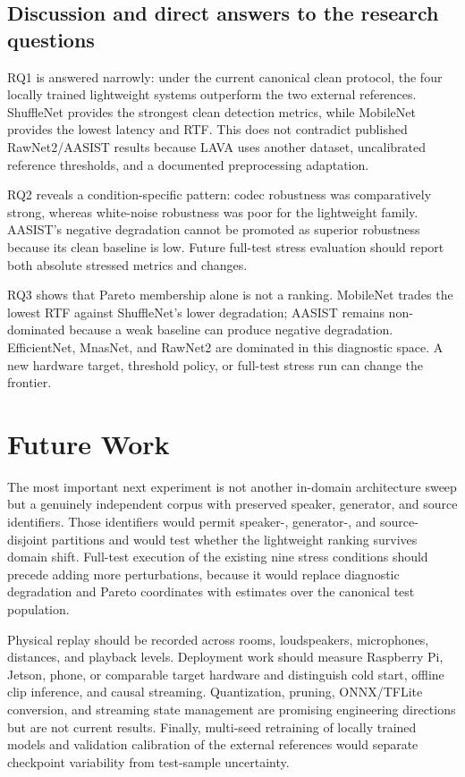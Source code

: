 \documentclass[10pt,journal,onecolumn]{IEEEtran}
\begin{document}
\subsection{Discussion and direct answers to the research questions}
RQ1 is answered narrowly: under the current canonical clean protocol, the four locally trained lightweight systems outperform the two external references. ShuffleNet provides the strongest clean detection metrics, while MobileNet provides the lowest latency and RTF. This does not contradict published RawNet2/AASIST results because LAVA uses another dataset, uncalibrated reference thresholds, and a documented preprocessing adaptation.

RQ2 reveals a condition-specific pattern: codec robustness was comparatively strong, whereas white-noise robustness was poor for the lightweight family. AASIST's negative degradation cannot be promoted as superior robustness because its clean baseline is low. Future full-test stress evaluation should report both absolute stressed metrics and changes.

RQ3 shows that Pareto membership alone is not a ranking. MobileNet trades the lowest RTF against ShuffleNet's lower degradation; AASIST remains non-dominated because a weak baseline can produce negative degradation. EfficientNet, MnasNet, and RawNet2 are dominated in this diagnostic space. A new hardware target, threshold policy, or full-test stress run can change the frontier.

\section{Future Work}
The most important next experiment is not another in-domain architecture sweep but a genuinely independent corpus with preserved speaker, generator, and source identifiers. Those identifiers would permit speaker-, generator-, and source-disjoint partitions and would test whether the lightweight ranking survives domain shift. Full-test execution of the existing nine stress conditions should precede adding more perturbations, because it would replace diagnostic degradation and Pareto coordinates with estimates over the canonical test population.

Physical replay should be recorded across rooms, loudspeakers, microphones, distances, and playback levels. Deployment work should measure Raspberry Pi, Jetson, phone, or comparable target hardware and distinguish cold start, offline clip inference, and causal streaming. Quantization, pruning, ONNX/TFLite conversion, and streaming state management are promising engineering directions but are not current results. Finally, multi-seed retraining of locally trained models and validation calibration of the external references would separate checkpoint variability from test-sample uncertainty.
\end{document}
